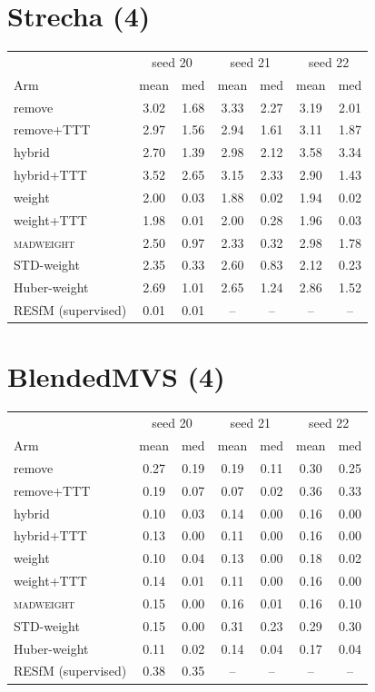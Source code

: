 \documentclass[10pt]{article}
\begin{document}
\section*{Strecha (4)}
\begin{tabular}{lcccccc}
\toprule
 & \multicolumn{2}{c}{seed 20} & \multicolumn{2}{c}{seed 21} & \multicolumn{2}{c}{seed 22}\\
Arm & mean & med & mean & med & mean & med\\
\midrule
remove & 3.02 & 1.68 & 3.33 & 2.27 & 3.19 & 2.01\\
remove+TTT & 2.97 & 1.56 & 2.94 & 1.61 & 3.11 & 1.87\\
hybrid & 2.70 & 1.39 & 2.98 & 2.12 & 3.58 & 3.34\\
hybrid+TTT & 3.52 & 2.65 & 3.15 & 2.33 & 2.90 & 1.43\\
weight & 2.00 & 0.03 & 1.88 & 0.02 & 1.94 & 0.02\\
weight+TTT & 1.98 & 0.01 & 2.00 & 0.28 & 1.96 & 0.03\\
\textsc{madweight} & 2.50 & 0.97 & 2.33 & 0.32 & 2.98 & 1.78\\
STD-weight & 2.35 & 0.33 & 2.60 & 0.83 & 2.12 & 0.23\\
Huber-weight & 2.69 & 1.01 & 2.65 & 1.24 & 2.86 & 1.52\\
\midrule
RESfM (supervised) & 0.01 & 0.01 & -- & -- & -- & --\\
\bottomrule
\end{tabular}
\vspace{1em}

\section*{BlendedMVS (4)}
\begin{tabular}{lcccccc}
\toprule
 & \multicolumn{2}{c}{seed 20} & \multicolumn{2}{c}{seed 21} & \multicolumn{2}{c}{seed 22}\\
Arm & mean & med & mean & med & mean & med\\
\midrule
remove & 0.27 & 0.19 & 0.19 & 0.11 & 0.30 & 0.25\\
remove+TTT & 0.19 & 0.07 & 0.07 & 0.02 & 0.36 & 0.33\\
hybrid & 0.10 & 0.03 & 0.14 & 0.00 & 0.16 & 0.00\\
hybrid+TTT & 0.13 & 0.00 & 0.11 & 0.00 & 0.16 & 0.00\\
weight & 0.10 & 0.04 & 0.13 & 0.00 & 0.18 & 0.02\\
weight+TTT & 0.14 & 0.01 & 0.11 & 0.00 & 0.16 & 0.00\\
\textsc{madweight} & 0.15 & 0.00 & 0.16 & 0.01 & 0.16 & 0.10\\
STD-weight & 0.15 & 0.00 & 0.31 & 0.23 & 0.29 & 0.30\\
Huber-weight & 0.11 & 0.02 & 0.14 & 0.04 & 0.17 & 0.04\\
\midrule
RESfM (supervised) & 0.38 & 0.35 & -- & -- & -- & --\\
\bottomrule
\end{tabular}
\vspace{1em}
\end{document}
